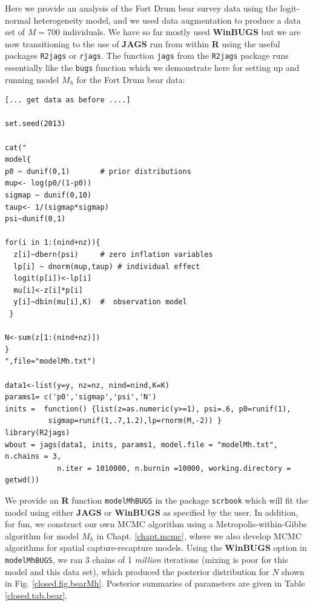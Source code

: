 Here we provide an analysis of the Fort Drum bear survey data using
the
 logit-normal heterogeneity model, and we
used data augmentation to produce a data
set of $M=700$ individuals.
We have so far mostly used
{\bf
  WinBUGS} but we are now 
transitioning to the use of {\bf JAGS} run from within {\bf R} using the useful packages
 \mbox{\tt R2jags} or \mbox{\tt rjags}.  The function \mbox{\tt jags}
 from the \mbox{\tt R2jags} package runs essentially like the
 \mbox{\tt bugs} function
which we demonstrate here 
for setting
 up and running model $M_{h}$ for the Fort Drum bear data:
{\small
\begin{verbatim}
[... get data as before ....]

set.seed(2013)

cat("
model{
p0 ~ dunif(0,1)       # prior distributions
mup<- log(p0/(1-p0))
sigmap ~ dunif(0,10)
taup<- 1/(sigmap*sigmap)
psi~dunif(0,1)

for(i in 1:(nind+nz)){
  z[i]~dbern(psi)     # zero inflation variables
  lp[i] ~ dnorm(mup,taup) # individual effect
  logit(p[i])<-lp[i]
  mu[i]<-z[i]*p[i]
  y[i]~dbin(mu[i],K)  #  observation model
 }

N<-sum(z[1:(nind+nz)])
}
",file="modelMh.txt")

data1<-list(y=y, nz=nz, nind=nind,K=K)
params1= c('p0','sigmap','psi','N')
inits =  function() {list(z=as.numeric(y>=1), psi=.6, p0=runif(1),
          sigmap=runif(1,.7,1.2),lp=rnorm(M,-2)) }
library(R2jags)
wbout = jags(data1, inits, params1, model.file = "modelMh.txt", n.chains = 3,
            n.iter = 1010000, n.burnin =10000, working.directory = getwd())
\end{verbatim}
}

We provide an {\bf R} function \mbox{\tt modelMhBUGS} in the package
\mbox{\tt scrbook} which will fit the model using either {\bf JAGS} or
{\bf WinBUGS} as specified by the user.  In addition, for fun, we
construct our own MCMC algorithm using a Metropolis-within-Gibbs
algorithm for model $M_{h}$ in Chapt. \ref{chapt.mcmc}, where we also
develop MCMC algorithms for spatial capture-recapture models.  Using
the {\bf WinBUGS} option in \mbox{\tt modelMhBUGS}, we ran 3 chains of 1
{\it million} iterations (mixing is poor for this model and this data
set), which produced the posterior distribution for $N$ shown in
Fig. \ref{closed.fig.bearMh}. Posterior summaries of parameters are
given in Table \ref{closed.tab.bear}.


